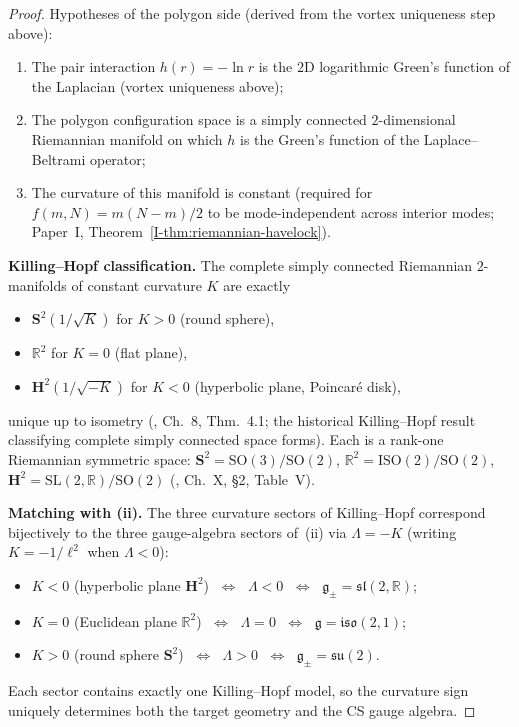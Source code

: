 \begin{proof}
Hypotheses of the polygon side (derived from the vortex
uniqueness step above):
\begin{enumerate}[label=(\roman*),leftmargin=*,topsep=0pt,itemsep=0pt]
\item The pair interaction $h(r) = -\ln r$ is the $2$D
  logarithmic Green's function of the Laplacian
  (vortex uniqueness above);
\item The polygon configuration space is a simply connected
  $2$-dimensional Riemannian manifold on which $h$ is the
  Green's function of the Laplace--Beltrami operator;
\item The curvature of this manifold is constant
  (required for $f(m,N) = m(N{-}m)/2$ to be mode-independent
  across interior modes; Paper~I,
  Theorem~\ref*{I-thm:riemannian-havelock}).
\end{enumerate}
\textbf{Killing--Hopf classification.}
The complete simply connected Riemannian $2$-manifolds of
constant curvature $K$ are exactly
\begin{itemize}[leftmargin=*,topsep=0pt,itemsep=0pt]
\item $\mathbf{S}^2(1/\sqrt{K})$ for $K > 0$ (round sphere),
\item $\mathbb{R}^2$ for $K = 0$ (flat plane),
\item $\mathbf{H}^2(1/\sqrt{-K})$ for $K < 0$
  (hyperbolic plane, Poincar\'e disk),
\end{itemize}
unique up to isometry (\citealt{doCarmo1992}, Ch.~8,
Thm.~4.1; the historical Killing--Hopf result classifying
complete simply connected space forms).
Each is a rank-one Riemannian symmetric space: $\mathbf{S}^2 = \mathrm{SO}(3)/\mathrm{SO}(2)$,
$\mathbb{R}^2 = \mathrm{ISO}(2)/\mathrm{SO}(2)$,
$\mathbf{H}^2 = \mathrm{SL}(2,\mathbb{R})/\mathrm{SO}(2)$
(\citealt{Helgason1978}, Ch.~X, \S2, Table~V).

\textbf{Matching with (ii).}
The three curvature sectors of Killing--Hopf correspond
bijectively to the three gauge-algebra sectors of~(ii)
via $\Lambda = -K$ (writing $K = -1/\ell^2$ when
$\Lambda < 0$):
\begin{itemize}[leftmargin=*,topsep=0pt,itemsep=0pt]
\item $K < 0$ (hyperbolic plane $\mathbf{H}^2$)
  $\;\Leftrightarrow\;$ $\Lambda < 0$
  $\;\Leftrightarrow\;$ $\mathfrak{g}_\pm = \mathfrak{sl}(2,\mathbb{R})$;
\item $K = 0$ (Euclidean plane $\mathbb{R}^2$)
  $\;\Leftrightarrow\;$ $\Lambda = 0$
  $\;\Leftrightarrow\;$ $\mathfrak{g} = \mathfrak{iso}(2,1)$;
\item $K > 0$ (round sphere $\mathbf{S}^2$)
  $\;\Leftrightarrow\;$ $\Lambda > 0$
  $\;\Leftrightarrow\;$ $\mathfrak{g}_\pm = \mathfrak{su}(2)$.
\end{itemize}
Each sector contains exactly one Killing--Hopf model,
so the curvature sign uniquely determines both the target
geometry and the CS gauge algebra.


\end{proof}
